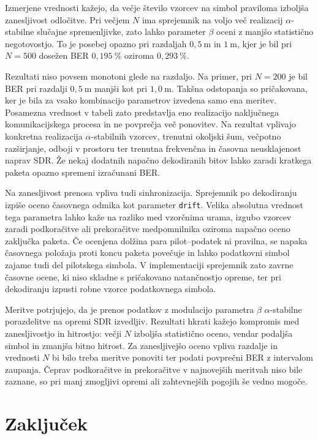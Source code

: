 \documentclass[a4paper, 12pt, openany]{book}
\begin{document}
Izmerjene vrednosti kažejo, da večje število vzorcev na simbol praviloma izboljša zanesljivost odločitve. Pri večjem $N$ ima sprejemnik na voljo več realizacij $\alpha$-stabilne slučajne spremenljivke, zato lahko parameter $\beta$ oceni z manjšo statistično negotovostjo. To je posebej opazno pri razdaljah $0{,}5~\mathrm{m}$ in $1~\mathrm{m}$, kjer je bil pri $N=500$ dosežen BER $0{,}195~\%$ oziroma $0{,}293~\%$.

Rezultati niso povsem monotoni glede na razdaljo. Na primer, pri $N=200$ je bil BER pri razdalji $0{,}5~\mathrm{m}$ manjši kot pri $1{,}0~\mathrm{m}$. Takšna odstopanja so pričakovana, ker je bila za vsako kombinacijo parametrov izvedena samo ena meritev. Posamezna vrednost v tabeli zato predstavlja eno realizacijo naključnega komunikacijskega procesa in ne povprečja več ponovitev. Na rezultat vplivajo konkretna realizacija $\alpha$-stabilnih vzorcev, trenutni okoljski šum, večpotno razširjanje, odboji v prostoru ter trenutna frekvenčna in časovna neusklajenost naprav SDR. Že nekaj dodatnih napačno dekodiranih bitov lahko zaradi kratkega paketa opazno spremeni izračunani BER.

Na zanesljivost prenosa vpliva tudi sinhronizacija. Sprejemnik po dekodiranju izpiše oceno časovnega odmika kot parameter \texttt{drift}. Velika absolutna vrednost tega parametra lahko kaže na razliko med vzorčnima urama, izgubo vzorcev zaradi podkoračitve ali prekoračitve medpomnilnika oziroma napačno oceno zaključka paketa. Če ocenjena dolžina para pilot--podatek ni pravilna, se napaka časovnega položaja proti koncu paketa povečuje in lahko podatkovni simbol zajame tudi del pilotskega simbola. V implementaciji sprejemnik zato zavrne časovne ocene, ki niso skladne s pričakovano natančnostjo opreme, ter pri dekodiranju izpusti robne vzorce podatkovnega simbola.

Meritve potrjujejo, da je prenos podatkov z modulacijo parametra $\beta$ $\alpha$-stabilne porazdelitve na opremi SDR izvedljiv. Rezultati hkrati kažejo kompromis med zanesljivostjo in hitrostjo: večji $N$ izboljša statistično oceno, vendar podaljša simbol in zmanjša bitno hitrost. Za zanesljivejšo oceno vpliva razdalje in vrednosti $N$ bi bilo treba meritve ponoviti ter podati povprečni BER z intervalom zaupanja. Čeprav podkoračitve in prekoračitve v najnovejših meritvah niso bile zaznane, so pri manj zmogljivi opremi ali zahtevnejših pogojih še vedno mogoče.

\chapter{Zaključek}
\end{document}
